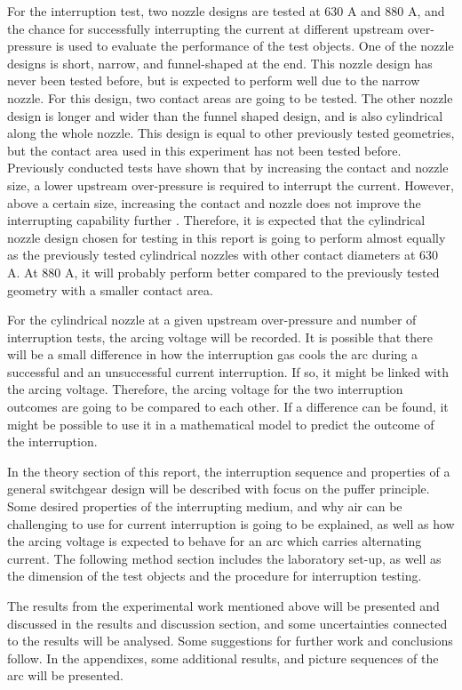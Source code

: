 \documentclass[10pt,b5paper,twoside]{article}
\begin{document}
For the interruption test, two nozzle designs are tested at 630 A and 880 A, and the chance for successfully interrupting the current at different upstream over-pressure is used to evaluate the performance of the test objects. One of the nozzle designs is short, narrow, and funnel-shaped at the end. This nozzle design has never been tested before, but is expected to perform well due to the narrow nozzle. For this design, two contact areas are going to be tested. The other nozzle design is longer and wider than the funnel shaped design, and is also cylindrical along the whole nozzle. This design is equal to other previously tested geometries, but the contact area used in this experiment has not been tested before. Previously conducted tests have shown that by increasing the contact and nozzle size, a lower upstream over-pressure is required to interrupt the current. However, above a certain size, increasing the contact and nozzle does not improve the interrupting capability further \cite{bib:AFIMVLBA}. Therefore, it is expected that the cylindrical nozzle design chosen for testing in this report is going to perform almost equally as the previously tested cylindrical nozzles with other contact diameters at 630 A. At 880 A, it will probably perform better compared to the previously tested geometry with a smaller contact area.

For the cylindrical nozzle at a given upstream over-pressure and number of interruption tests, the arcing voltage will be recorded. It is possible that there will be a small difference in how the interruption gas cools the arc during a successful and an unsuccessful current interruption. If so, it might be linked with the arcing voltage. Therefore, the arcing voltage for the two interruption outcomes are going to be compared to each other. If a difference can be found, it might be possible to use it in a mathematical model to predict the outcome of the interruption.

In the theory section of this report, the interruption sequence and properties of a general switchgear design will be described with focus on the puffer principle. Some desired properties of the interrupting medium, and why air can be challenging to use for current interruption is going to be explained, as well as how the arcing voltage is expected to behave for an arc which carries alternating current. The following method section includes the laboratory set-up, as well as the dimension of the test objects and the procedure for interruption testing.

The results from the experimental work mentioned above will be presented and discussed in the results and discussion section, and some uncertainties connected to the results will be analysed. Some suggestions for further work and conclusions follow. In the appendixes, some additional results, and picture sequences of the arc will be presented.
\end{document}
